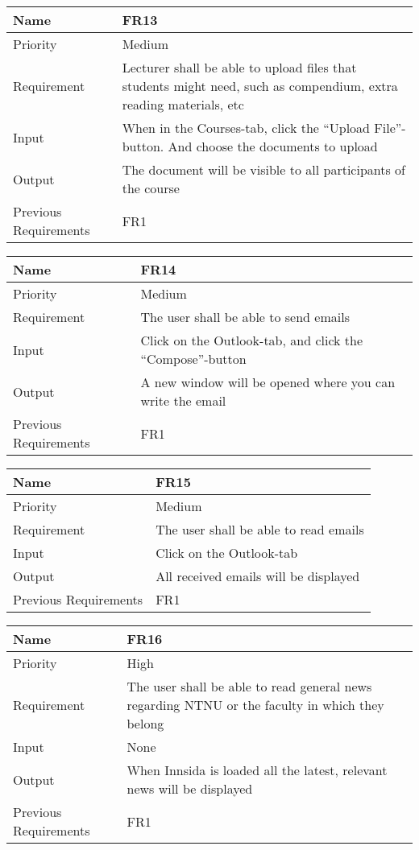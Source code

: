\begin{tabularx}{\textwidth}{|l|X|}
  \hline
  Name & FR13 \\ \hline
  Priority & Medium \\ \hline
  Requirement & Lecturer shall be able to upload files that students might need, such as compendium, extra reading materials, etc \\ \hline
  Input & When in the Courses-tab, click the “Upload File”-button. And choose the documents to upload \\ \hline
  Output & The document will be visible to all participants of the course \\ \hline
  Previous Requirements & FR1 \\ \hline
\end{tabularx}

\begin{tabularx}{\textwidth}{|l|X|}
  \hline
  Name & FR14 \\ \hline
  Priority & Medium \\ \hline
  Requirement & The user shall be able to send emails \\ \hline
  Input & Click on the Outlook-tab, and click the “Compose”-button \\ \hline
  Output & A new window will be opened where you can write the email \\ \hline
  Previous Requirements & FR1 \\ \hline
\end{tabularx}

\begin{tabularx}{\textwidth}{|l|X|}
  \hline
  Name & FR15 \\ \hline
  Priority & Medium \\ \hline
  Requirement & The user shall be able to read emails \\ \hline
  Input & Click on the Outlook-tab \\ \hline
  Output & All received emails will be displayed \\ \hline
  Previous Requirements & FR1 \\ \hline
\end{tabularx}

\begin{tabularx}{\textwidth}{|l|X|}
  \hline
  Name & FR16 \\ \hline
  Priority & High \\ \hline
  Requirement & The user shall be able to read general news regarding NTNU or the faculty in which they belong \\ \hline
  Input & None \\ \hline
  Output & When Innsida is loaded all the latest, relevant news will be displayed \\ \hline
  Previous Requirements & FR1 \\ \hline
\end{tabularx}

